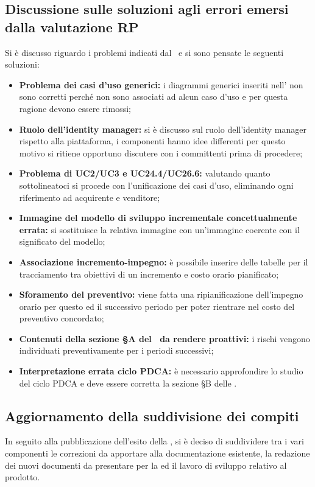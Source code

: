 \subsection{Discussione sulle soluzioni agli errori emersi dalla valutazione RP}
Si è discusso riguardo i problemi indicati dal \VT\ e si sono pensate le seguenti soluzioni:
\begin{itemize}
	\item \textbf{Problema dei casi d'uso generici:} i diagrammi generici inseriti nell' non sono corretti perché non sono associati ad alcun caso d'uso e per questa ragione devono essere rimossi;
	\item \textbf{Ruolo dell'identity manager:} si è discusso sul ruolo dell'identity manager rispetto alla piattaforma, i componenti hanno idee differenti per questo motivo si ritiene opportuno discutere con i committenti prima di procedere;
	\item \textbf{Problema di UC2/UC3 e UC24.4/UC26.6:} valutando quanto sottolineatoci si procede con l'unificazione dei casi d'uso, eliminando ogni riferimento ad acquirente e venditore;
	\item \textbf{Immagine del modello di sviluppo incrementale concettualmente errata:} si sostituisce la relativa immagine con un'immagine coerente con il significato del modello;
	\item \textbf{Associazione incremento-impegno:} è possibile inserire delle tabelle per il tracciamento tra obiettivi di un incremento e costo orario pianificato;
	\item \textbf{Sforamento del preventivo:} viene fatta una ripianificazione dell'impegno orario per questo ed il successivo periodo per poter rientrare nel costo del preventivo concordato;
	\item \textbf{Contenuti della sezione \S{}A del \PdP\ da rendere proattivi:} i rischi vengono individuati preventivamente per i periodi successivi;
	\item \textbf{Interpretazione errata ciclo PDCA:} è necessario approfondire lo studio del ciclo PDCA e deve essere corretta la sezione \S{}B delle \NdP.
\end{itemize}
\subsection{Aggiornamento della suddivisione dei compiti}
In seguito alla pubblicazione dell'esito della , si è deciso di suddividere tra i vari componenti le correzioni da apportare alla documentazione esistente, la redazione dei nuovi documenti da presentare per la  ed il lavoro di sviluppo relativo al prodotto.

